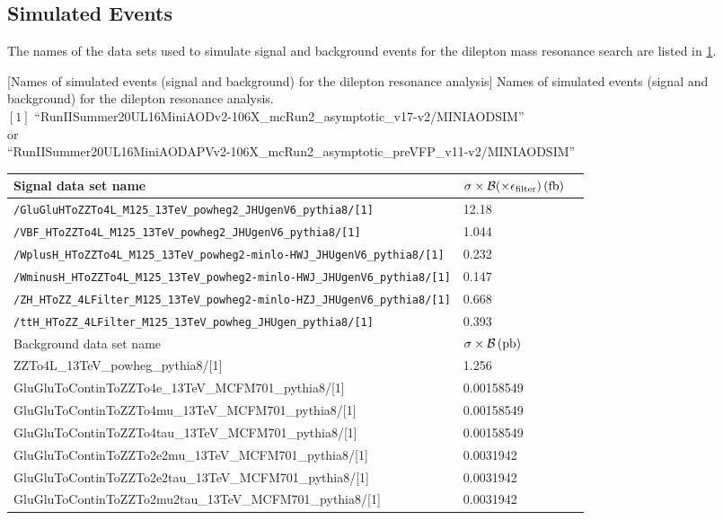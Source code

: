\subsection{Simulated Events}
\label{sec:sim_samples_dilep}
The names of the data sets used to simulate signal and background events for the dilepton mass resonance search are listed in \cref{table:dilep_simSamples}.
\begin{table}[h]
    \small
    \centering
        [Names of simulated events (signal and background) for the dilepton resonance analysis]
        {Names of simulated events (signal and background) for the dilepton resonance analysis. \\
        $[1]$ ``RunIISummer20UL16MiniAODv2-106X\_mcRun2\_asymptotic\_v17-v2/MINIAODSIM''
        \\
        or
        \\
        ``RunIISummer20UL16MiniAODAPVv2-106X\_mcRun2\_asymptotic\_preVFP\_v11-v2/MINIAODSIM''}
	\begin{tabular}{lll}
            \hline      
        Signal data set name & $\sigma \times \mathcal{B}(\times \epsilon_\text{filter})\,(\text{fb})$ \\
            \hline
		\texttt{/GluGluHToZZTo4L\_M125\_13TeV\_powheg2\_JHUgenV6\_pythia8/[1]}	&	12.18	\\
		\texttt{/VBF\_HToZZTo4L\_M125\_13TeV\_powheg2\_JHUgenV6\_pythia8/[1]} & 1.044       \\
		\texttt{/WplusH\_HToZZTo4L\_M125\_13TeV\_powheg2-minlo-HWJ\_JHUgenV6\_pythia8/[1]} & 0.232 \\
		\texttt{/WminusH\_HToZZTo4L\_M125\_13TeV\_powheg2-minlo-HWJ\_JHUgenV6\_pythia8/[1]} & 0.147 \\
		\texttt{/ZH\_HToZZ\_4LFilter\_M125\_13TeV\_powheg2-minlo-HZJ\_JHUgenV6\_pythia8/[1]} & 0.668 \\
		\texttt{/ttH\_HToZZ\_4LFilter\_M125\_13TeV\_powheg\_JHUgen\_pythia8/[1]} & 0.393 \\
            \hline	
            \hline	
        Background data set name & $\sigma \times \mathcal{B}\,(\text{pb})$ \\
            \hline	
		ZZTo4L\_13TeV\_powheg\_pythia8/[1]	&	1.256	\\
		GluGluToContinToZZTo4e\_13TeV\_MCFM701\_pythia8/[1]	&	0.00158549	\\
		GluGluToContinToZZTo4mu\_13TeV\_MCFM701\_pythia8/[1]	&	0.00158549	\\
		GluGluToContinToZZTo4tau\_13TeV\_MCFM701\_pythia8/[1]	&	0.00158549	\\
		GluGluToContinToZZTo2e2mu\_13TeV\_MCFM701\_pythia8/[1]	&	0.0031942	\\
		GluGluToContinToZZTo2e2tau\_13TeV\_MCFM701\_pythia8/[1]	&	0.0031942	\\
		GluGluToContinToZZTo2mu2tau\_13TeV\_MCFM701\_pythia8/[1]	&	0.0031942	\\
            \hline
        \end{tabular}
    \label{table:dilep_simSamples}
\end{table}